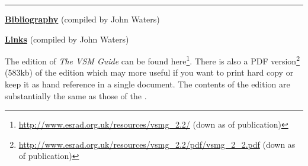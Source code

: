 \noindent\rule{\textwidth}{0.5pt}
\hyperref[BIBLIOGRAPHY]{\textbf{Bibliography}} (compiled by John Waters)

\hyperref[LINKS]{\textbf{Links}} (compiled by John Waters)

The  edition of \textit{The VSM Guide} can be found here\footnote{\href{http://www.esrad.org.uk/resources/vsmg_2.2/}{http://www.esrad.org.uk/resources/vsmg\_2.2/} (down as of publication)}. There is also a PDF version\footnote{\href{http://www.esrad.org.uk/resources/vsmg_2.2/pdf/vsmg_2_2.pdf}{http://www.esrad.org.uk/resources/vsmg\_2.2/pdf/vsmg\_2\_2.pdf} (down as of publication)} (583kb) of the  edition which may more useful if you want to print hard copy or keep it as hand reference in a single document. The contents of the  edition are substantially the same as those of the .

\noindent{}